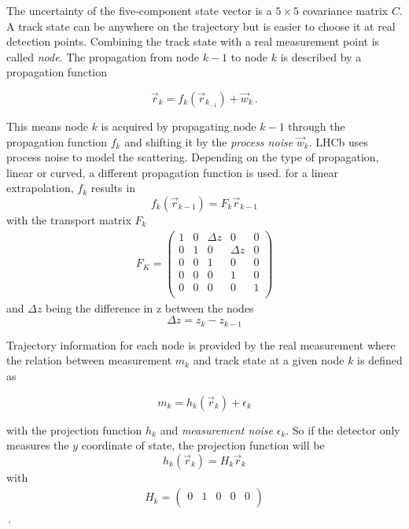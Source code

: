 The uncertainty of the five-component state vector is a $5\times5$ covariance matrix $C$.
A track state can be anywhere on the trajectory but is easier to choose it at real detection points. Combining the track state with a real measurement point is called \textit{node}.
The propagation from node $k-1$ to node $k$ is described by a propagation function

\begin{equation*}
  \vec{r}_k = f_k(\vec{r}_{k_{-1}}) + \vec{w}_k\,.
\end{equation*}

This means node $k$ is acquired by propagating node $k-1$ through the propagation function $f_k$ and shifting it by the \textit{process noise} $\vec{w}_k$.
LHCb uses process noise to model the scattering.
Depending on the type of propagation, linear or curved, a different propagation function is used.
for a linear extrapolation, $f_k$ results in
\begin{equation*}
  f_k \left(\vec{r}_{k-1}\right) = F_k \vec{r}_{k-1}
\end{equation*}
with the transport matrix $F_k$
\begin{gather*}
  F_K = \begin{pmatrix}
    1 & 0 & \Delta z & 0 & 0 \\
    0 & 1 & 0 & \Delta z & 0 \\
    0 & 0 & 1 & 0 & 0 \\
    0 & 0 & 0 & 1 & 0 \\
    0 & 0 & 0 & 0 & 1 \\
  \end{pmatrix}
\end{gather*}
and $\Delta z$ being the difference in z between the nodes
\begin{equation*}
  \Delta z = z_k - z_{k-1}
\end{equation*}

Trajectory information for each node is provided by the real measurement where the relation between measurement $m_k$ and track state at a given node $k$ is defined as

\begin{equation*}
  m_k = h_k(\vec{r}_k) + \epsilon_k
\end{equation*}

with the projection function $h_k$ and \textit{measurement noise} $\epsilon_k$.
So if the detector only measures the $y$ coordinate of state, the projection function
will be
\begin{equation*}
  h_k(\vec{r}_k) = H_k \vec{r}_k
\end{equation*}
with
\begin{gather*}
  H_k = \begin{pmatrix}
    0 & 1 & 0 & 0 & 0 \\
  \end{pmatrix}
\end{gather*}\,.

